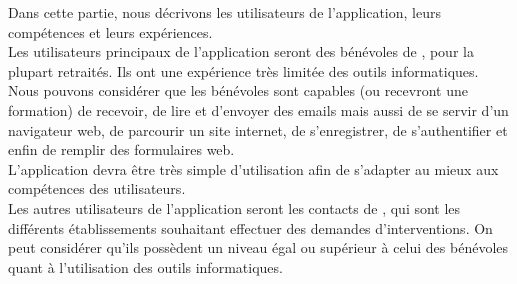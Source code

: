 Dans cette partie, nous décrivons les utilisateurs de l'application, leurs compétences et leurs expériences.\\ 

Les utilisateurs principaux de l'application seront des bénévoles de \nomClient{}, pour la plupart retraités. Ils ont une expérience très limitée des outils informatiques. Nous pouvons considérer que les bénévoles sont capables (ou recevront une formation) de recevoir, de lire et d'envoyer des emails mais aussi de se servir d'un navigateur web, de parcourir un site internet, de s'enregistrer, de s'authentifier et enfin de remplir des formulaires web.\\

L'application devra être très simple d'utilisation afin de s'adapter au mieux aux compétences des utilisateurs.\\

Les autres utilisateurs de l'application seront les contacts de \nomClient{}, qui sont les différents établissements souhaitant effectuer des demandes d'interventions. On peut considérer qu'ils possèdent un niveau égal ou supérieur à celui des bénévoles quant à l'utilisation des outils informatiques.
